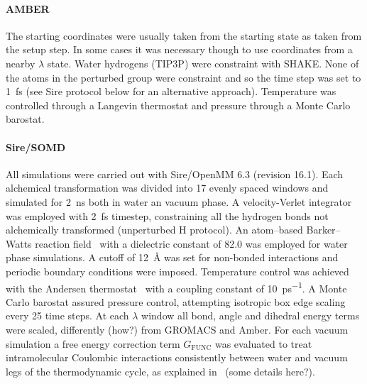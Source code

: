 \documentclass[journal=jctcce,manuscript=article]{achemso}
\begin{document}
\paragraph{AMBER} The starting coordinates were usually taken from the
starting state as taken from the setup step.  In some cases it was
necessary though to use coordinates from a nearby $\lambda$ state.
Water hydrogens (TIP3P) were constraint with SHAKE.  None of the atoms
in the perturbed group were constraint and so the time step was set to
\SI{1}{fs} (see Sire protocol below for an alternative approach).
Temperature was controlled through a Langevin thermostat and pressure
through a Monte Carlo barostat.

\paragraph{Sire/SOMD} All simulations were carried out with
Sire/OpenMM 6.3 (revision 16.1).  Each alchemical transformation was
divided into 17 evenly spaced windows and simulated for \SI{2}{ns}
both in water an vacuum phase. A velocity-Verlet integrator was
employed with \SI{2}{fs} timestep, constraining all the hydrogen bonds
not alchemically transformed (unperturbed H protocol). An atom--based
Barker--Watts reaction field~\cite{doi:10.1080/00268977300102101} with
a dielectric constant of \num{82.0} was employed for water phase
simulations. A cutoff of \SI{12}{\angstrom} was set for non-bonded
interactions and periodic boundary conditions were imposed.
Temperature control was achieved with the Andersen
thermostat~\cite{doi:10.1063/1.439486} with a coupling constant of
\SI{10}{ps^{-1}}.  A Monte Carlo barostat assured pressure control,
attempting isotropic box edge scaling every 25 time steps. At each
$\lambda$ window all bond, angle and dihedral energy terms were
scaled, differently {\color{red} (how?)} from GROMACS and Amber.  For each vacuum
simulation a free energy correction term $G_{\mathrm{FUNC}}$ was
evaluated to treat intramolecular Coulombic interactions consistently
between water and vacuum legs of the thermodynamic cycle, as explained
in~\cite{Bosisio2016} {\color{red} (some details here?)}.
\end{document}
